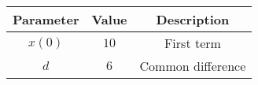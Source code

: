 \begin{tabular}{|c|c|c|}
    \hline
    \textbf{Parameter} & \textbf{Value} & \textbf{Description} \\
    \hline
    $x(0)$ & $10$ & First term \\
    \hline
    $d$ & $6$ & Common difference \\
    \hline 
\end{tabular}

